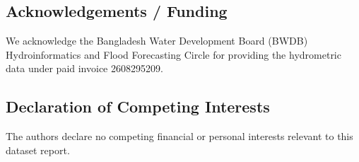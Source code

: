 \documentclass[11pt,a4paper]{article}
\begin{document}
\subsection{Acknowledgements / Funding}
We acknowledge the Bangladesh Water Development Board (BWDB) Hydroinformatics and Flood Forecasting Circle for providing the hydrometric data under paid invoice 2608295209.

\subsection{Declaration of Competing Interests}
The authors declare no competing financial or personal interests relevant to this dataset report.

\renewcommand{\refname}{17. References}
\end{document}
